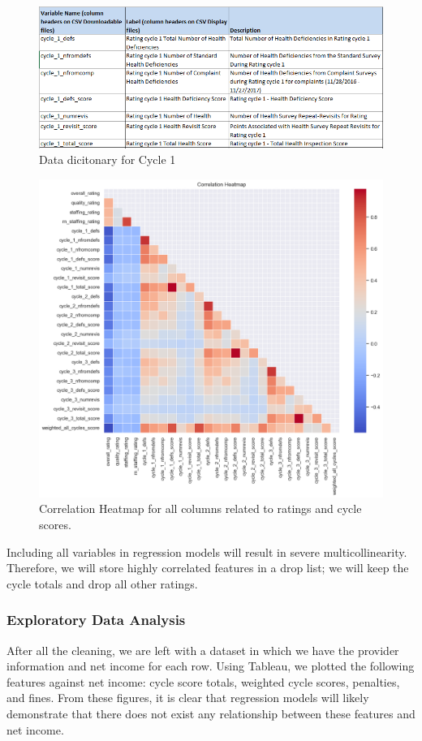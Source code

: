 \documentclass{article}
\theoremstyle{mytheoremstyle}
\theoremstyle{mytheoremstyle}
\theoremstyle{myproblemstyle}
\begin{document}
\begin{figure}[htbp]
\centering
\includegraphics[width=0.8\linewidth]{Images/multicolin.png}
\caption{Data dicitonary for Cycle 1}
\label{fig:Multicolin Results}
\end{figure}

\pagebreak
\begin{figure}[htbp]
\centering
\includegraphics[width=0.8\linewidth]{Images/multicolinheat.png}
\caption{Correlation Heatmap for all columns related to ratings and cycle scores.}
\label{fig:Correl Heatmap}
\end{figure}

Including all variables in regression models will result in severe multicollinearity. Therefore, we will store highly correlated features in a drop list; we will keep the cycle totals and drop all other ratings.

\subsubsection{Exploratory Data Analysis}
After all the cleaning, we are left with a dataset in which we have the provider information and net income for each row. Using Tableau, we plotted the following features against net income: cycle score totals, weighted cycle scores, penalties, and fines. From these figures, it is clear that regression models will likely demonstrate that there does not exist any relationship between these features and net income.
\end{document}

